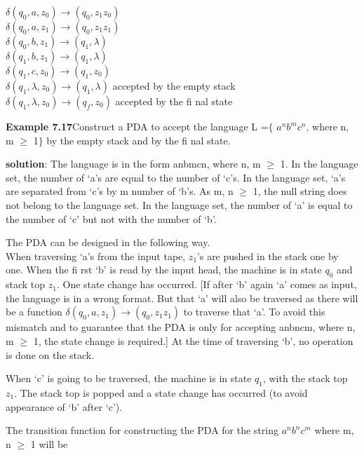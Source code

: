 \documentclass{article}
\begin{document}
	\begin{center}
		\hspace{4mm}$\delta$$(q_0,a,z_0)\xrightarrow{}(q_0,z_1z_0)$\\
		\hspace{4mm}$\delta$$(q_0,a,z_1)\xrightarrow{}(q_0,z_1z_1)$\\
		$\delta$$(q_0,b,z_1)\xrightarrow{}(q_1,\lambda)$\\
		$\delta$$(q_1,b,z_1)\xrightarrow{}(q_1,\lambda)$\\
		$\delta$$(q_1,c,z_0)\xrightarrow{}(q_1,z_0)$\\
		\hspace{4.5cm}$\delta$$(q_1,\lambda,z_0)\xrightarrow{}(q_1,\lambda)$ accepted by the empty stack\\
		\hspace{4.5cm}$\delta$$(q_1,\lambda,z_0)\xrightarrow{}(q_f,z_0)$ accepted by the fi nal state\\
	\end{center}
	\begin{flushleft}
	\textbf{Example 7.17}\hspace{5mm}Construct a PDA to accept the language L =$\lbrace$ $a^{n}b^{m}c^{n}$, where n, m $\geq$ 1$\rbrace$ by the empty stack and by the fi nal state.
	\end{flushleft}
	\begin{flushleft}
		\textbf{solution}: The language is in the form anbmcn, where n, m $\geq$ 1. In the language set, the number of ‘a’s are
		equal to the number of ‘c’s. In the language set, ‘a’s are separated from ‘c’s by m number of ‘b’s. As m,
		n $\geq$ 1, the null string does not belong to the language set. In the language set, the number of ‘a’ is equal
		to the number of ‘c’ but not with the number of ‘b’.
		
		\hspace{5mm}The PDA can be designed in the following way.\\
		\hspace{5mm}When traversing ‘a’s from the input tape, $z_1$’s are pushed in the stack one by one. When the fi rst ‘b’
		is read by the input head, the machine is in state $q_0$ and stack top $z_1$. One state change has occurred. [If
		after ‘b’ again ‘a’ comes as input, the language is in a wrong format. But that ‘a’ will also be traversed
		as there will be a function $\delta$$(q_0, a, z_1)\xrightarrow{}(q_0,z_1z_1)$ to traverse that ‘a’. To avoid this mismatch and to
		guarantee that the PDA is only for accepting anbncm, where n, m $\geq$ 1, the state change is required.] At the
		time of traversing ‘b’, no operation is done on the stack.
		
		
		\hspace{5mm}When ‘c’ is going to be traversed, the machine is in state $q_1$, with the stack top $z_1$. The stack top is
		popped and a state change has occurred (to avoid appearance of ‘b’ after ‘c’).
		
		
		\hspace{5mm}The transition function for constructing the PDA for the string $a^{n}b^{n}c^{m}$ where m, n $\geq$ 1 will be
		
\end{flushleft}
	
\end{document}
